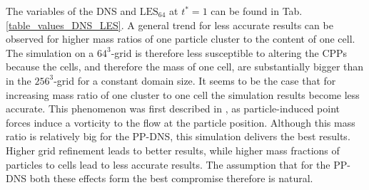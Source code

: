 \documentclass[11pt,a4paper,openany,oneside,parskip=half*]{article}
\begin{document}
The variables of the DNS and $\mathrm{LES_{64}}$ at $t^* = 1$ can be found in Tab.\ref{table_values_DNS_LES}. A general trend for less accurate results can be observed for higher mass ratios of one particle cluster to the content of one cell. The simulation on a $64^3$-grid is therefore less susceptible to altering the CPPs because the cells, and therefore the mass of one cell, are substantially bigger than in the $256^3$-grid for a constant domain size. It seems to be the case that for increasing mass ratio of one cluster to one cell the simulation results become less accurate. This phenomenon was first described in \cite{maxey1997simulations}, as particle-induced point forces induce a vorticity to the flow at the particle position. Although this mass ratio is relatively big for the PP-DNS, this simulation delivers the best results. Higher grid refinement leads to better results, while higher mass fractions of particles to cells lead to less accurate results. The assumption that for the PP-DNS both these effects form the best compromise therefore is natural. 
\end{document}
